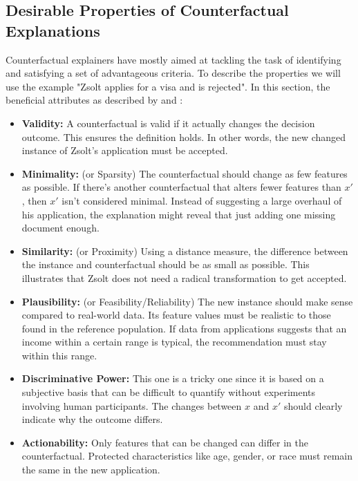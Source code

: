 \subsection{Desirable Properties of Counterfactual Explanations \label{subsection:properties}}
Counterfactual explainers have mostly aimed at tackling the task of identifying and satisfying a set of advantageous criteria. To describe the properties we will use the example "Zsolt applies for a visa and is rejected".
In this section, the beneficial attributes as described by \citet{guidotti2024counterfactual} and \citet{verma2024counterfactual}:

\begin{itemize}
    \item \textbf{Validity:} A counterfactual is valid if it actually changes the decision outcome. This ensures the definition holds. In other words, the new changed instance of Zsolt's application must be accepted.
    \item \textbf{Minimality:} (or Sparsity) The counterfactual should change as few features as possible. If there’s another counterfactual that alters fewer features than $x'$, then $x'$ isn’t considered minimal. Instead of suggesting a large overhaul of his application, the explanation might reveal that just adding one missing document enough.
    \item \textbf{Similarity:} (or Proximity) Using a distance measure, the difference between the instance and counterfactual should be as small as possible. This illustrates that Zsolt does not need a radical transformation to get accepted.
    \item \textbf{Plausibility:} (or Feasibility/Reliability) The new instance should make sense compared to real-world data. Its feature values must be realistic to those found in the reference population. If data from applications suggests that an income within a certain range is typical, the recommendation must stay within this range.
    \item \textbf{Discriminative Power:} This one is a tricky one since it is based on a subjective basis that can be difficult to quantify without experiments involving human participants. The changes between $x$ and $x'$ should clearly indicate why the outcome differs.
    \item \textbf{Actionability:} Only features that can be changed can differ in the counterfactual. Protected characteristics like age, gender, or race must remain the same in the new application.

\end{itemize}
